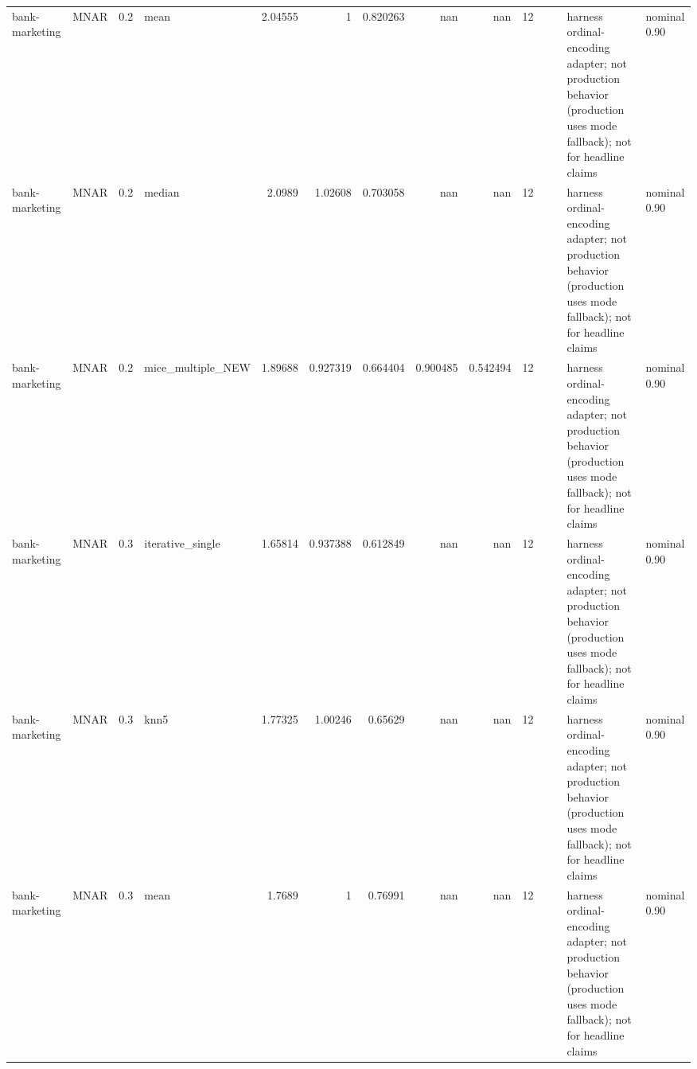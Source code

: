 \begin{table}[ht]
\begin{tabular}{llrlrrrrrrllll}
 bank-marketing       & MNAR        &         0.2 & mean              &       2.04555  &             1        &                 0.820263 &                     nan        &                       nan        &        12 &                    &                                         & harness ordinal-encoding adapter; not production behavior (production uses mode fallback); not for headline claims & nominal 0.90              \\
 bank-marketing       & MNAR        &         0.2 & median            &       2.0989   &             1.02608  &                 0.703058 &                     nan        &                       nan        &        12 &                    &                                         & harness ordinal-encoding adapter; not production behavior (production uses mode fallback); not for headline claims & nominal 0.90              \\
 bank-marketing       & MNAR        &         0.2 & mice\_multiple\_NEW &       1.89688  &             0.927319 &                 0.664404 &                       0.900485 &                         0.542494 &        12 &                    &                                         & harness ordinal-encoding adapter; not production behavior (production uses mode fallback); not for headline claims & nominal 0.90              \\
 bank-marketing       & MNAR        &         0.3 & iterative\_single  &       1.65814  &             0.937388 &                 0.612849 &                     nan        &                       nan        &        12 &                    &                                         & harness ordinal-encoding adapter; not production behavior (production uses mode fallback); not for headline claims & nominal 0.90              \\
 bank-marketing       & MNAR        &         0.3 & knn5              &       1.77325  &             1.00246  &                 0.65629  &                     nan        &                       nan        &        12 &                    &                                         & harness ordinal-encoding adapter; not production behavior (production uses mode fallback); not for headline claims & nominal 0.90              \\
 bank-marketing       & MNAR        &         0.3 & mean              &       1.7689   &             1        &                 0.76991  &                     nan        &                       nan        &        12 &                    &                                         & harness ordinal-encoding adapter; not production behavior (production uses mode fallback); not for headline claims & nominal 0.90              \\

\end{tabular}
\end{table}
